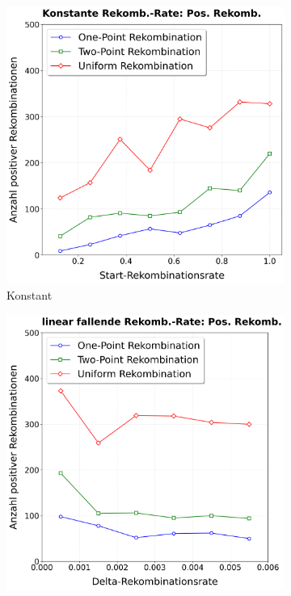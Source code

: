 \begin{figure}[H]
	\centering
	\begin{subfigure}[b]{0.32\textwidth}
		\includegraphics[width=\textwidth]{Bilder/KozaPlotPositiveRekombinationKonstant.png}
		\caption{Konstant}
		\label{fig:kozaPosRekombinationKonstant}
	\end{subfigure}%
	\hfill
	\begin{subfigure}[b]{0.32\textwidth}
		\includegraphics[width=\textwidth]{Bilder/KozaPlotPositiveRekombinationClegg.png}

\end{subfigure}
\end{figure}
